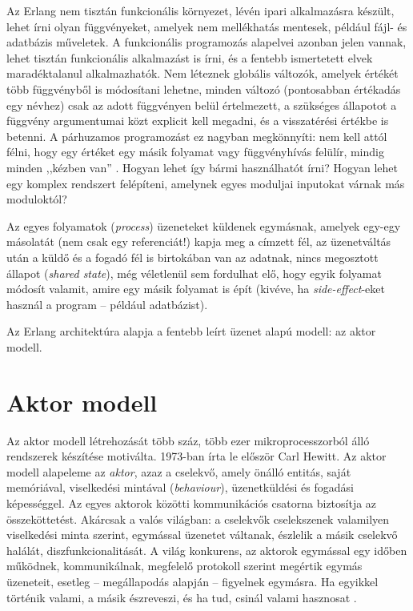\documentclass[12pt, a4paper, oneside]{book}
\begin{document}
Az Erlang nem tisztán funkcionális környezet, lévén ipari alkalmazásra készült,
lehet írni olyan függvényeket, amelyek nem mellékhatás mentesek, például fájl-
és adatbázis műveletek. A funkcionális programozás alapelvei azonban jelen
vannak, lehet tisztán funkcionális alkalmazást is írni, és a fentebb
ismertetett elvek maradéktalanul alkalmazhatók. Nem léteznek globális változók,
amelyek értékét több függvényből is módosítani lehetne, minden változó
(pontosabban értékadás egy névhez) csak az adott függvényen belül értelmezett,
a szükséges állapotot a függvény argumentumai közt explicit kell megadni, és a
visszatérési értékbe is betenni. A párhuzamos programozást ez nagyban
megkönnyíti: nem kell attól félni, hogy egy értéket egy másik folyamat vagy
függvényhívás felülír, mindig minden ,,kézben van'' \citep{ArmstrongThesis}.
Hogyan lehet így bármi használhatót írni? Hogyan lehet egy komplex rendszert
felépíteni, amelynek egyes moduljai inputokat várnak más moduloktól?

Az egyes folyamatok (\emph{process}) üzeneteket küldenek egymásnak, amelyek
egy-egy másolatát (nem csak egy referenciát!) kapja meg a címzett fél, az
üzenetváltás után a küldő és a fogadó fél is birtokában van az adatnak, nincs
megosztott állapot (\emph{shared state}), még véletlenül sem fordulhat elő,
hogy egyik folyamat módosít valamit, amire egy másik folyamat is épít (kivéve,
ha \emph{side-effect}-eket használ a program -- például adatbázist).

Az Erlang architektúra alapja a fentebb leírt üzenet alapú modell: az aktor
modell.

\section{Aktor modell} 

Az aktor modell létrehozását több száz, több ezer mikroprocesszorból álló
rendszerek készítése motiválta. 1973-ban írta le először Carl Hewitt. Az aktor
modell alapeleme az \emph{aktor}, azaz a cselekvő, amely önálló entitás, saját
memóriával, viselkedési mintával (\emph{behaviour}), üzenetküldési és fogadási
képességgel. Az egyes aktorok közötti kommunikációs csatorna biztosítja az
összeköttetést. Akárcsak a valós világban: a cselekvők cselekszenek valamilyen
viselkedési minta szerint, egymással üzenetet váltanak, észlelik a másik
cselekvő halálát, diszfunkcionalitását. A világ konkurens, az aktorok egymással
egy időben működnek, kommunikálnak, megfelelő protokoll szerint megértik
egymás üzeneteit, esetleg -- megállapodás alapján -- figyelnek egymásra. Ha
egyikkel történik valami, a másik észreveszi, és ha tud, csinál valami
hasznosat \citep{Hewitt}.
\end{document}
